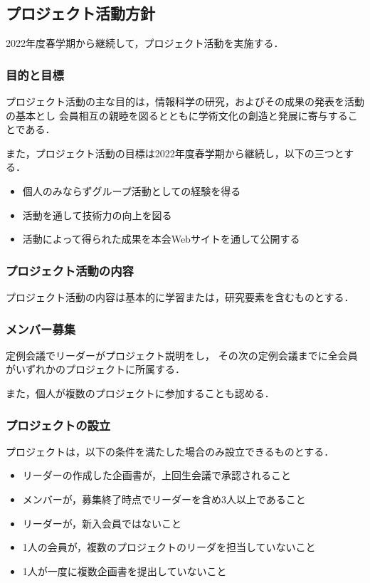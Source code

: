\subsection*{プロジェクト活動方針}

2022年度春学期から継続して，プロジェクト活動を実施する．

\subsubsection*{目的と目標}
プロジェクト活動の主な目的は，情報科学の研究，およびその成果の発表を活動の基本とし
会員相互の親睦を図るとともに学術文化の創造と発展に寄与することである．

また，プロジェクト活動の目標は2022年度春学期から継続し，以下の三つとする．

\begin{itemize}
  \item 個人のみならずグループ活動としての経験を得る
  \item 活動を通して技術力の向上を図る
  \item 活動によって得られた成果を本会Webサイトを通して公開する
\end{itemize}

\subsubsection*{プロジェクト活動の内容}
プロジェクト活動の内容は基本的に学習または，研究要素を含むものとする．

\subsubsection*{メンバー募集}
定例会議でリーダーがプロジェクト説明をし，
その次の定例会議までに全会員がいずれかのプロジェクトに所属する．

また，個人が複数のプロジェクトに参加することも認める．

\subsubsection*{プロジェクトの設立}
プロジェクトは，以下の条件を満たした場合のみ設立できるものとする．

\begin{itemize}
  \item リーダーの作成した企画書が，上回生会議で承認されること
  \item メンバーが，募集終了時点でリーダーを含め3人以上であること
  \item リーダーが，新入会員ではないこと
  \item 1人の会員が，複数のプロジェクトのリーダを担当していないこと
  \item 1人が一度に複数企画書を提出していないこと
\end{itemize}

